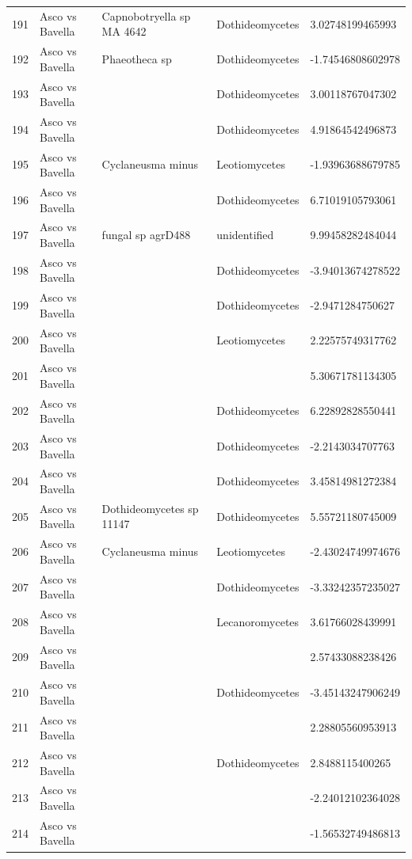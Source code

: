 \documentclass[12pt]{article}\usepackage[]{graphicx}\usepackage[]{color}
\numberwithin{figure}{section}
\begin{document}
\begin{table}[ht]
\begin{tabular}{lllll}
  191 & Asco vs Bavella & Capnobotryella sp MA 4642 & Dothideomycetes & 3.02748199465993 \\ 
  192 & Asco vs Bavella & Phaeotheca sp & Dothideomycetes & -1.74546808602978 \\ 
  193 & Asco vs Bavella &  & Dothideomycetes & 3.00118767047302 \\ 
  194 & Asco vs Bavella &  & Dothideomycetes & 4.91864542496873 \\ 
  195 & Asco vs Bavella & Cyclaneusma minus & Leotiomycetes & -1.93963688679785 \\ 
  196 & Asco vs Bavella &  & Dothideomycetes & 6.71019105793061 \\ 
  197 & Asco vs Bavella & fungal sp agrD488 & unidentified & 9.99458282484044 \\ 
  198 & Asco vs Bavella &  & Dothideomycetes & -3.94013674278522 \\ 
  199 & Asco vs Bavella &  & Dothideomycetes & -2.9471284750627 \\ 
  200 & Asco vs Bavella &  & Leotiomycetes & 2.22575749317762 \\ 
  201 & Asco vs Bavella &  &  & 5.30671781134305 \\ 
  202 & Asco vs Bavella &  & Dothideomycetes & 6.22892828550441 \\ 
  203 & Asco vs Bavella &  & Dothideomycetes & -2.2143034707763 \\ 
  204 & Asco vs Bavella &  & Dothideomycetes & 3.45814981272384 \\ 
  205 & Asco vs Bavella & Dothideomycetes sp 11147 & Dothideomycetes & 5.55721180745009 \\ 
  206 & Asco vs Bavella & Cyclaneusma minus & Leotiomycetes & -2.43024749974676 \\ 
  207 & Asco vs Bavella &  & Dothideomycetes & -3.33242357235027 \\ 
  208 & Asco vs Bavella &  & Lecanoromycetes & 3.61766028439991 \\ 
  209 & Asco vs Bavella &  &  & 2.57433088238426 \\ 
  210 & Asco vs Bavella &  & Dothideomycetes & -3.45143247906249 \\ 
  211 & Asco vs Bavella &  &  & 2.28805560953913 \\ 
  212 & Asco vs Bavella &  & Dothideomycetes & 2.8488115400265 \\ 
  213 & Asco vs Bavella &  &  & -2.24012102364028 \\ 
  214 & Asco vs Bavella &  &  & -1.56532749486813 \\ 

\end{tabular}
\end{table}
\end{document}
